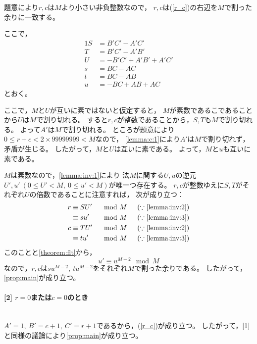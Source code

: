 \documentclass{article}
\makeatletter
\renewenvironment{proof}[1][\proofname]{\par
        \pushQED{\qed}
        \normalfont
        \topsep6\p@\@plus6\p@ \trivlist
        \item[\hskip\labelsep{\bfseries #1}\@addpunct{\bfseries}]\ignorespaces
    }{%
        \popQED\endtrivlist\@endpefalse
    }
\renewcommand{\proofname}{証明.}
\newcommand{\myparagraph}[1]{\paragraph{#1}\mbox{}\\}
\makeatother
\begin{document}
\begin{proof}
    題意により$r, c$は$M$より小さい非負整数なので，
    $r, c$は(\ref{r_c})の右辺を$M$で割った余りに一致する。

    ここで，
    \begin{alignat}{1}
        S &= B'C' - A'C' \\
        T &= B'C' - A'B' \\
        U &= -B'C' + A'B' + A'C' \\
        s &= BC - AC \\
        t &= BC - AB \\
        u &= -BC + AB + AC
    \end{alignat}
    とおく。

    ここで，$M$と$U$が互いに素ではないと仮定すると，
    $M$が素数であるこであることから$U$は$M$で割り切れる。
    すると$r, c$が整数であることから，$S, T$も$M$で割り切れる。
    よって$A'$は$M$で割り切れる。
    ところが題意により$0 \leq r + c < 2 \times 99999999 < M$なので，
    \cref{lemma:c:1}により$A'$は$M$で割り切れず，矛盾が生じる。
    したがって，$M$と$U$は互いに素である。
    よって，$M$と$u$も互いに素である。

    $M$は素数なので，\cref{lemma:inv:1}により
    法$M$に関する$U, u$の逆元$U', u'\ (0 \leq U' < M,\ 0 \leq u' < M)$が唯一つ存在する。
    $r, c$が整数ゆえに$S, T$がそれぞれ$U$の倍数であることに注意すれば，
    次が成り立つ：
    \begin{alignat}{2}
        r &\equiv SU' & &\mod{M} \hspace{15pt} (\because \mbox{\cref{lemma:inv:2}}) \\
          &\equiv su' & &\mod{M} \hspace{15pt} (\because \mbox{\cref{lemma:inv:3}}) \\
        c &\equiv TU' & &\mod{M} \hspace{15pt} (\because \mbox{\cref{lemma:inv:2}}) \\
          &\equiv tu' & &\mod{M} \hspace{15pt} (\because \mbox{\cref{lemma:inv:3}})
    \end{alignat}
    このことと\cref{theorem:flt}から，
    \begin{equation}
        u' \equiv u^{M - 2} \mod{M}
    \end{equation}
    なので，$r, c$は$su^{M - 2},\ tu^{M - 2}$をそれぞれ$M$で割った余りである。
    したがって，\cref{prop:main}が成り立つ。

    \myparagraph{[2] $r = 0$または$c = 0$のとき}

    $A' = 1,\ B' = c + 1,\ C' = r + 1$であるから，(\ref{r_c})が成り立つ。
    したがって，[1]と同様の議論により\cref{prop:main}が成り立つ。
\end{proof}
\end{document}

